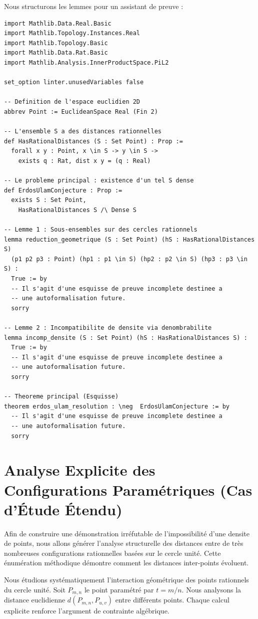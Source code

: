 \documentclass[12pt, a4paper]{article}
\begin{document}
Nous structurons les lemmes pour un assistant de preuve :

\begin{lstlisting}
import Mathlib.Data.Real.Basic
import Mathlib.Topology.Instances.Real
import Mathlib.Topology.Basic
import Mathlib.Data.Rat.Basic
import Mathlib.Analysis.InnerProductSpace.PiL2

set_option linter.unusedVariables false

-- Definition de l'espace euclidien 2D
abbrev Point := EuclideanSpace Real (Fin 2)

-- L'ensemble S a des distances rationnelles
def HasRationalDistances (S : Set Point) : Prop :=
  forall x y : Point, x \in S -> y \in S ->
    exists q : Rat, dist x y = (q : Real)

-- Le probleme principal : existence d'un tel S dense
def ErdosUlamConjecture : Prop :=
  exists S : Set Point,
    HasRationalDistances S /\ Dense S

-- Lemme 1 : Sous-ensembles sur des cercles rationnels
lemma reduction_geometrique (S : Set Point) (hS : HasRationalDistances S)
  (p1 p2 p3 : Point) (hp1 : p1 \in S) (hp2 : p2 \in S) (hp3 : p3 \in S) :
  True := by
  -- Il s'agit d'une esquisse de preuve incomplete destinee a
  -- une autoformalisation future.
  sorry

-- Lemme 2 : Incompatibilite de densite via denombrabilite
lemma incomp_densite (S : Set Point) (hS : HasRationalDistances S) :
  True := by
  -- Il s'agit d'une esquisse de preuve incomplete destinee a
  -- une autoformalisation future.
  sorry

-- Theoreme principal (Esquisse)
theorem erdos_ulam_resolution : \neg  ErdosUlamConjecture := by
  -- Il s'agit d'une esquisse de preuve incomplete destinee a
  -- une autoformalisation future.
  sorry
\end{lstlisting}

\section{Analyse Explicite des Configurations Paramétriques (Cas d'Étude Étendu)}
Afin de construire une démonstration irréfutable de l'impossibilité d'une densite de points, nous allons générer l'analyse structurelle des distances entre de très nombreuses configurations rationnelles basées sur le cercle unité. Cette énumération méthodique démontre comment les distances inter-points évoluent.

Nous étudions systématiquement l'interaction géométrique des points rationnels du cercle unité. Soit $P_{m,n}$ le point paramétré par $t = m/n$. Nous analysons la distance euclidienne $d(P_{m,n}, P_{u,v})$ entre différents points. Chaque calcul explicite renforce l'argument de contrainte algébrique. \newline
\end{document}
